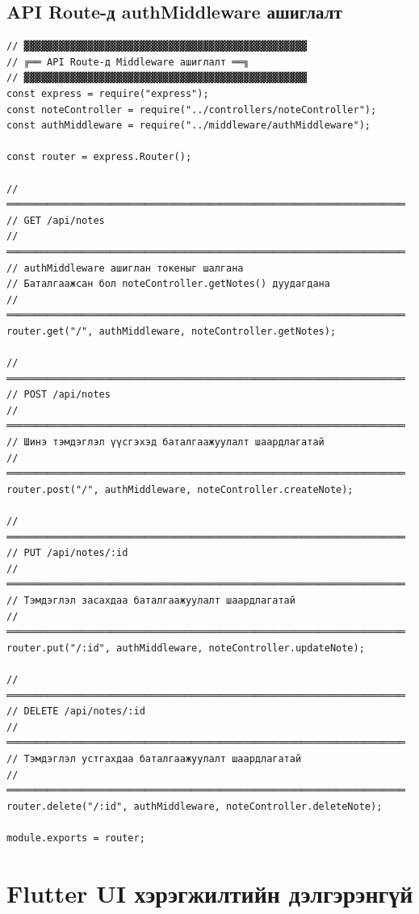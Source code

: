 \subsection{API Route-д authMiddleware ашиглалт}

\begin{lstlisting}[caption={routes/notes.js -- authMiddleware хэрэгжилт}]
// ▓▓▓▓▓▓▓▓▓▓▓▓▓▓▓▓▓▓▓▓▓▓▓▓▓▓▓▓▓▓▓▓▓▓▓▓▓▓▓▓▓▓▓▓▓▓▓▓▓
// ╔══ API Route-д Middleware ашиглалт ══╗
// ▓▓▓▓▓▓▓▓▓▓▓▓▓▓▓▓▓▓▓▓▓▓▓▓▓▓▓▓▓▓▓▓▓▓▓▓▓▓▓▓▓▓▓▓▓▓▓▓▓
const express = require("express");
const noteController = require("../controllers/noteController");
const authMiddleware = require("../middleware/authMiddleware");

const router = express.Router();

// ═════════════════════════════════════════════════════════════════════
// GET /api/notes
// ═════════════════════════════════════════════════════════════════════
// authMiddleware ашиглан токеныг шалгана
// Баталгаажсан бол noteController.getNotes() дуудагдана
// ═════════════════════════════════════════════════════════════════════
router.get("/", authMiddleware, noteController.getNotes);

// ═════════════════════════════════════════════════════════════════════
// POST /api/notes
// ═════════════════════════════════════════════════════════════════════
// Шинэ тэмдэглэл үүсгэхэд баталгаажуулалт шаардлагатай
// ═════════════════════════════════════════════════════════════════════
router.post("/", authMiddleware, noteController.createNote);

// ═════════════════════════════════════════════════════════════════════
// PUT /api/notes/:id
// ═════════════════════════════════════════════════════════════════════
// Тэмдэглэл засахдаа баталгаажуулалт шаардлагатай
// ═════════════════════════════════════════════════════════════════════
router.put("/:id", authMiddleware, noteController.updateNote);

// ═════════════════════════════════════════════════════════════════════
// DELETE /api/notes/:id
// ═════════════════════════════════════════════════════════════════════
// Тэмдэглэл устгахдаа баталгаажуулалт шаардлагатай
// ═════════════════════════════════════════════════════════════════════
router.delete("/:id", authMiddleware, noteController.deleteNote);

module.exports = router;
\end{lstlisting}

\section{Flutter UI хэрэгжилтийн дэлгэрэнгүй}

